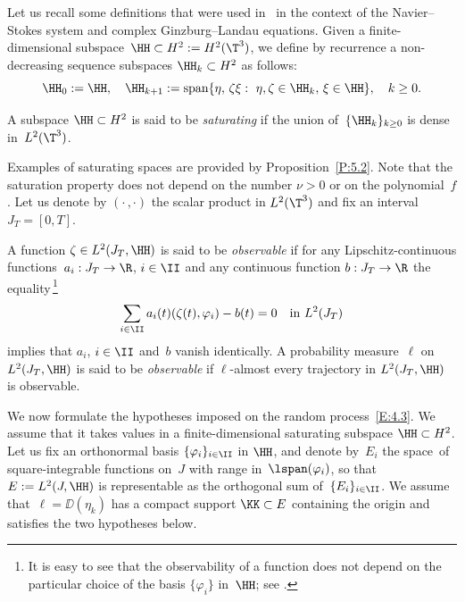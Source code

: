 Let us recall some definitions that were used in~\cite{KNS-2020} in the context of the Navier--Stokes system and complex Ginzburg--Landau equations. Given a finite-dimensional subspace~$\HH\subset H^2:=H^2(\T^3)$, we define by recurrence a non-decreasing sequence subspaces $\HH_k\subset H^2$ as follows:
\begin{equation} \label{Hk}
\HH_0:=\HH, \quad \HH_{k+1}:=\text{span}\{\eta,\,\zeta\xi: \,\,\eta,\zeta\in\HH_k,\,\xi\in\HH\},\quad k\ge0.
\end{equation}

\begin{definition}\label{D:4.1}
A subspace $\HH\subset H^2$ is said to be \emph{saturating} if the union of~$\{\HH_k\}_{k\ge0}$ is dense in~$L^2(\T^3)$.
\end{definition}

Examples of saturating spaces are provided by Proposition~\ref{P:5.2}. Note that the saturation property does not depend on the number $\nu>0$ or on the polynomial~$f$. Let us denote by $(\cdot\,,\cdot)$ the scalar product in $L^2(\T^3)$ and fix an interval $J_T=[0,T]$.

\begin{definition} \label{D:4.2}
A function $\zeta\in L^2(J_T,\HH)$ is said to be \emph{observable} if for any Lipschitz-continuous functions~$a_i:J_T\to\R$, $i\in\II$ and any continuous function $b:J_T\to\R$ the equality\,\footnote{It is easy to see that the observability of a function does not depend on the particular choice of the basis $\{\varphi_i\}$ in~$\HH$; see \cite[Rem.\,1.4]{KNS-2020}.}
\[
\sum_{i\in\II}a_i(t)(\zeta(t),\varphi_i)-b(t)=0\quad\text{in $L^2(J_T)$}
\]
implies that $a_i$, $i\in\II$ and~$b$ vanish identically. A probability measure~$\ell$ on~$L^2(J_T,\HH)$ is said to be \emph{observable} if $\ell$-almost every trajectory in $L^2(J_T,\HH)$ is observable.
\end{definition}

We now formulate the hypotheses imposed on the random process~\eqref{E:4.3}. We assume that it takes values in a finite-dimensional saturating subspace $\HH\subset H^2$. Let us fix an orthonormal basis $\{\varphi_i\}_{i\in\II}$ in $\HH$, and denote by~$E_i$ the space~of square-integrable functions on~$J$ with range in~$\lspan(\varphi_i)$, so that $E:=L^2(J,\HH)$ is representable as the orthogonal sum of~$\{E_i\}_{i\in\II}$. We assume that~$\ell=\DD(\eta_k)$ has a compact support $\KK\subset E$ containing the origin and satisfies the two hypotheses below.

